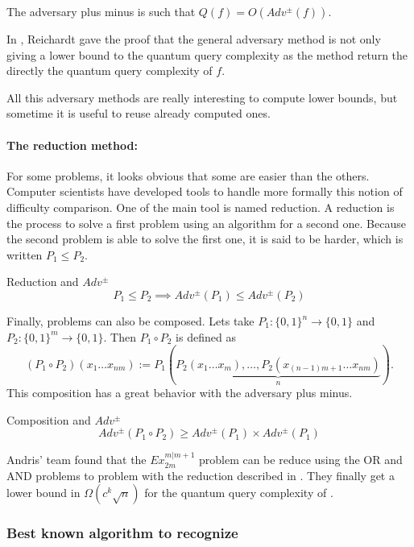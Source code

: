 \begin{itemize}
          \begin{theorem}
              The adversary plus minus is such that $Q(f) = O(Adv^{\pm}(f))$.
          \end{theorem}

          In \cite{Reichardt_2009}, Reichardt gave the proof that the general adversary method
          is not only giving a lower bound to the quantum query complexity as the method
          return the directly the quantum query complexity of $f$.
\end{itemize}

All this adversary methods are really interesting to compute lower bounds, but sometime it is
useful to reuse already computed ones.


\paragraph*{\textbf{The reduction method:}}

For some problems, it looks obvious that some are easier than the others.
Computer scientists have developed tools to handle more formally this notion
of difficulty comparison. One of the main tool is named reduction. A reduction
is the process to solve a first problem using an algorithm for a second one.
Because the second problem is able to solve the first one, it is said to be
harder, which is written $P_1 \leq P_2$.
\begin{theorem}{Reduction and $Adv^{\pm}$}
    \[P_1 \leq P_2 \implies Adv^{\pm}(P_1) \leq Adv^{\pm}(P_2)\]
\end{theorem}
Finally, problems can also be composed. Lets take $P_1:\{0, 1\}^n \to \{0, 1\}$
and $P_2:\{0, 1\}^m \to \{0, 1\}$. Then $P_1 \circ P_2$ is defined as
\[(P_1 \circ P_2)(x_1 \ldots x_{nm}) := P_1\left(\underbrace{P_2(x_1\ldots x_m), \ldots, P_2(x_{(n-1)m+1}\ldots x_{nm})}_{n}\right).\]
This composition has a great behavior with the adversary plus minus.
\begin{theorem}{Composition and $Adv^{\pm}$}
    \[Adv^{\pm}(P_1 \circ P_2) \geq Adv^{\pm}(P_1)\times Adv^{\pm}(P_1)\]
\end{theorem}
Andris' team found that the $Ex_{2m}^{m\vert m+1}$ problem can be reduce using the OR and AND
problems to  problem with the reduction described in \cite{art:2DGrid}. They finally
get a lower bound in $\Omega(c^k\sqrt{n})$ for the quantum query complexity of .


\subsubsection{Best known algorithm to recognize }
\label{already_known}

